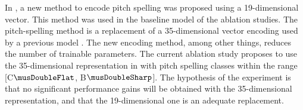 
In , a new method to encode
pitch spelling was proposed using a 19-dimensional vector.
This method was used in the baseline model of the ablation
studies. The pitch-spelling method is a replacement of a
35-dimensional vector encoding used by a previous model
\parencite{micchi2021deep}. The new encoding method, among
other things, reduces the number of trainable parameters.
The current ablation study proposes to use the
35-dimensional representation in \textcite{micchi2021deep}
with pitch spelling classes within the range
[C$\musDoubleFlat$, B$\musDoubleSharp$]. The hypothesis of
the experiment is that no significant performance gains will
be obtained with the 35-dimensional representation, and that
the 19-dimensional one is an adequate replacement.
